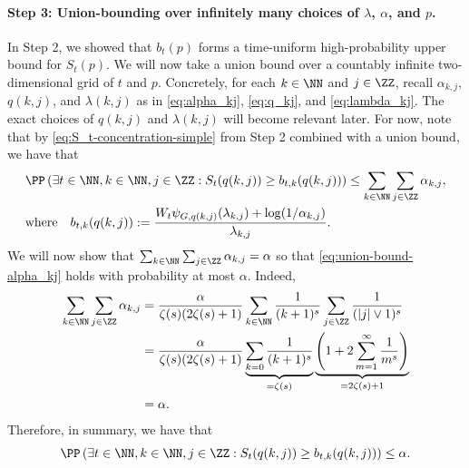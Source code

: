     \paragraph{Step 3: Union-bounding over infinitely many choices of $\lambda$, $\alpha$, and $p$.}
    In Step 2, we showed that $b_t(p)$ forms a time-uniform high-probability upper bound for $S_t(p)$. We will now take a union bound over a countably infinite two-dimensional grid of $t$ and $p$. Concretely, for each $k \in \NN$ and $j \in \ZZ$, recall $\alpha_{k, j}$, $q(k,j)$, and $\lambda(k,j)$ as in \eqref{eq:alpha_kj}, \eqref{eq:q_kj}, and \eqref{eq:lambda_kj}.
    The exact choices of $q(k,j)$ and $\lambda(k,j)$ will become relevant later. For now, note that by \eqref{eq:S_t-concentration-simple} from Step 2 combined with a union bound, we have that
    \begin{align}
      &\PP \left ( \exists t \in \NN, k \in \NN, j \in \ZZ : S_t(q(k,j)) \geq b_{t,k}(q(k,j)) \right ) \leq \sum_{k \in \NN} \sum_{j \in \ZZ} \alpha_{k, j}, \label{eq:union-bound-alpha_kj}\\
        &\text{where}~~~ b_{t,k}(q(k,j)) := \frac{W_t\psi_{G, q(k,j)}(\lambda_{k,j}) + \log(1/\alpha_{k,j})}{\lambda_{k,j}}.
    \end{align}
    We will now show that $\sum_{k\in \NN}\sum_{j \in \ZZ}\alpha_{k,j} = \alpha$ so that \eqref{eq:union-bound-alpha_kj} holds with probability at most $\alpha$. Indeed,
    \begin{align*}
      \sum_{k \in \NN} \sum_{j \in \ZZ} \alpha_{k,j} &= \frac{\alpha}{\zeta(s) (2\zeta(s) + 1)}\sum_{k \in \NN} \frac{1}{(k+1)^s} \sum_{j \in \ZZ} \frac{1}{(|j| \lor 1)^s} \\
      &= \frac{\alpha}{\zeta(s) (2\zeta(s) + 1)} \underbrace{\sum_{k =0} \frac{1}{(k+1)^s}}_{= \zeta(s)} \underbrace{\left ( 1 + 2 \sum_{m=1}^\infty \frac{1}{m^s} \right ) }_{= 2\zeta(s) + 1}\\
                                                     &= \alpha.
    \end{align*}
    Therefore, in summary, we have that
    \begin{equation}\label{eq:union-bound-alpha}
      \PP \left ( \exists t \in \NN, k \in \NN, j \in \ZZ : S_t(q(k,j)) \geq b_{t,k}(q(k,j)) \right ) \leq \alpha.
    \end{equation}

